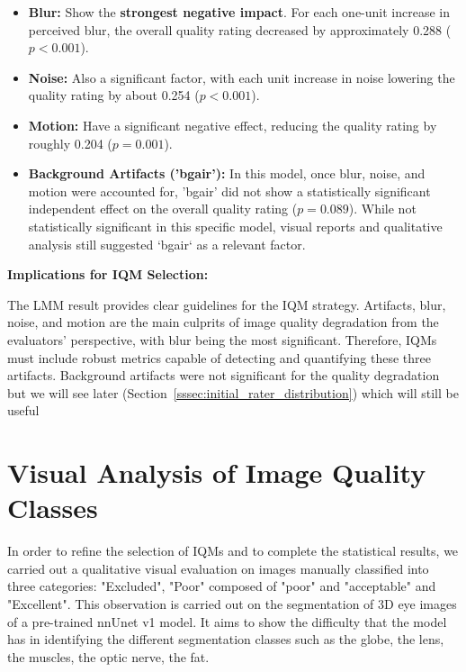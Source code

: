 \begin{itemize}
    \item \textbf{Blur:} Show the \textbf{strongest negative impact}. For each one-unit increase in perceived blur, the overall quality rating decreased by approximately 0.288 ($p < 0.001$).
    \item \textbf{Noise:} Also a significant factor, with each unit increase in noise lowering the quality rating by about 0.254 ($p < 0.001$).
    \item \textbf{Motion:} Have a significant negative effect, reducing the quality rating by roughly 0.204 ($p = 0.001$).
    \item \textbf{Background Artifacts ('bgair'):} In this model, once blur, noise, and motion were accounted for, 'bgair' did not show a statistically significant independent effect on the overall quality rating ($p = 0.089$). While not statistically significant in this specific model, visual reports and qualitative analysis still suggested `bgair` as a relevant factor.
\end{itemize}

\textbf{Implications for IQM Selection:}

The LMM result provides clear guidelines for the IQM strategy. Artifacts, blur, noise, and motion are the main culprits of image quality degradation from the evaluators' perspective, with blur being the most significant. Therefore, IQMs must include robust metrics capable of detecting and quantifying these three artifacts. Background artifacts were not significant for the quality degradation but we will see later (Section~\ref{sssec:initial_rater_distribution}) which will still be useful


\section{Visual Analysis of Image Quality Classes}
\label{sec:visual_analysis_iq_classes}

In order to refine the selection of IQMs and to complete the statistical results, we carried out a qualitative visual evaluation on images manually classified into three categories: "Excluded", "Poor" composed of "poor" and "acceptable" and "Excellent". This observation is carried out on the segmentation of 3D eye images of a pre-trained nnUnet v1 model. It aims to show the difficulty that the model has in identifying the different segmentation classes such as the globe, the lens, the muscles, the optic nerve, the fat.

